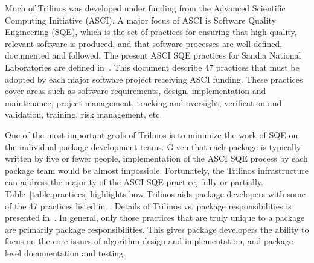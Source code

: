 \documentclass[acmtoms,acmnow]{acmtrans2m}
\begin{document}
Much of Trilinos was developed under funding from the Advanced
Scientific Computing Initiative (ASCI).  A major focus of ASCI is
Software Quality Engineering (SQE), which is the set of practices for
ensuring that
high-quality, relevant software is produced, and that software
processes are well-defined, documented and followed.  The present ASCI
SQE practices for Sandia National Laboratories are defined
in~\cite{ASCISQE2003}.  This document describe 47 practices that must
be adopted by each major software project receiving ASCI funding.
These practices cover areas such as software requirements, design,
implementation and maintenance, project management, tracking and
oversight, verification and validation, training, risk management,
etc.  

One of the most important goals of Trilinos is to minimize the work
of SQE on the individual package development teams.  Given
that each package is typically written by five or fewer people,
implementation of the ASCI SQE process by each package team would be
almost impossible.  Fortunately, the Trilinos infrastructure
can address the majority of the ASCI SQE practice, fully or
partially.  Table~\ref{table:practices} highlights how Trilinos aids
package developers with some of the 47 practices listed in~\cite{ASCISQE2003}.
Details of Trilinos vs. package responsibilities is presented 
in~\cite{Trilinos-Dev-Guide-II}.   In general, only those practices that are truly
unique to a package are primarily package responsibilities.  This gives
package developers the ability to focus on the core issues of
algorithm design and implementation, and package level documentation
and testing.
\end{document}
